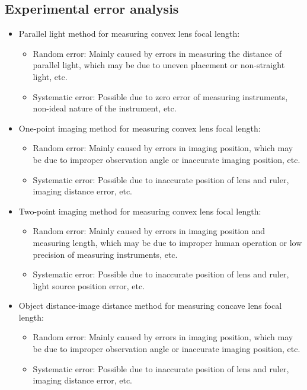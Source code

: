 \documentclass[UTF8]{article}
\begin{document}
\subsection{Experimental error analysis}
\begin{itemize}
\item Parallel light method for measuring convex lens focal length:
\begin{itemize}
\item Random error: Mainly caused by errors in measuring the distance of parallel light, which may be due to uneven placement or non-straight light, etc.
\item Systematic error: Possible due to zero error of measuring instruments, non-ideal nature of the instrument, etc.
\end{itemize}
\item One-point imaging method for measuring convex lens focal length:
\begin{itemize}
\item Random error: Mainly caused by errors in imaging position, which may be due to improper observation angle or inaccurate imaging position, etc.
\item Systematic error: Possible due to inaccurate position of lens and ruler, imaging distance error, etc.
\end{itemize}
\item Two-point imaging method for measuring convex lens focal length:
\begin{itemize}
\item Random error: Mainly caused by errors in imaging position and measuring length, which may be due to improper human operation or low precision of measuring instruments, etc.
\item Systematic error: Possible due to inaccurate position of lens and ruler, light source position error, etc.
\end{itemize}
\item Object distance-image distance method for measuring concave lens focal length:
\begin{itemize}
\item Random error: Mainly caused by errors in imaging position, which may be due to improper observation angle or inaccurate imaging position, etc.
\item Systematic error: Possible due to inaccurate position of lens and ruler, imaging distance error, etc.
\end{itemize}
\end{itemize}
\end{document}
